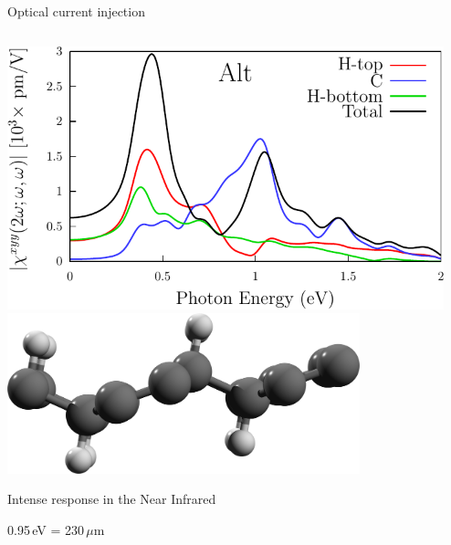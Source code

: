 \documentclass{beamer}
\begin{document}
\begin{frame}

\begin{center}
{\Large Optical current injection}
\end{center}

\begin{columns}

\begin{center}
\small

\includegraphics[width=0.99\textwidth]{figs/plots/shg-lay-alt.pdf}
\vspace{3mm}
\includegraphics[width=0.8\textwidth]{figs/alt2.png}

Intense response in the Near Infrared

0.95\,eV = 230\,$\mu$m

\end{center}

\begin{center}
\small 


\end{center}
\end{columns}
\end{frame}
\end{document}
